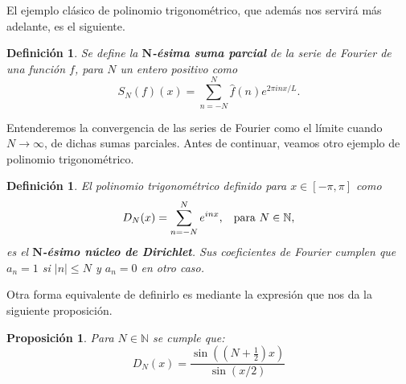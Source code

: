 \documentclass[12pt]{article}
\newcommand{\N}{\mathbb{N}}
\theoremstyle{plain}
\newtheorem{proposicion}[teorema]{Proposición}
\newtheorem{definicion}[teorema]{\textbf{Definición}}
\theoremstyle{definition}
\numberwithin{equation}{section}
\begin{document}
        El ejemplo clásico de polinomio trigonométrico, que además nos servirá más adelante, es el siguiente. 
        \begin{definicion}
            Se define la \textbf{$\boldsymbol{N}$-ésima suma parcial} de la serie de Fourier de una función \(f\), para \(N\) un entero positivo como
        \begin{equation*}
            S_N (f)(x) = \sum_{n=-N}^{N} \hat{f}(n) e^{2\pi inx/L}.
        \end{equation*}
        \end{definicion}
        Entenderemos la convergencia de las series de Fourier como el límite cuando \(N \to \infty\), de dichas sumas parciales.
        Antes de continuar, veamos otro ejemplo de polinomio trigonométrico.
        \begin{definicion}
            El polinomio trigonométrico definido para \(x \in [-\pi,\pi]\) como
        \begin{equation}
            \label{diri}
            D_N (x)= \sum_{n = -N}^{N} e^{inx}, \hspace{3mm} \text{para \(N \in \N\)},
        \end{equation}
        es el \textbf{$\boldsymbol{N}$-ésimo núcleo de Dirichlet}. Sus coeficientes de Fourier cumplen que \(a_n = 1\) si \(|n| \leq N\) y \(a_n = 0\) en otro caso.
        \end{definicion}
        Otra forma equivalente de definirlo es mediante la expresión que nos da la siguiente proposición.
        \begin{proposicion}
            Para \(N \in \N\) se cumple que: $$D_N (x)= \frac{\sin((N+\frac{1}{2})x)}{\sin (x/2)}$$
        \end{proposicion}
\end{document}
